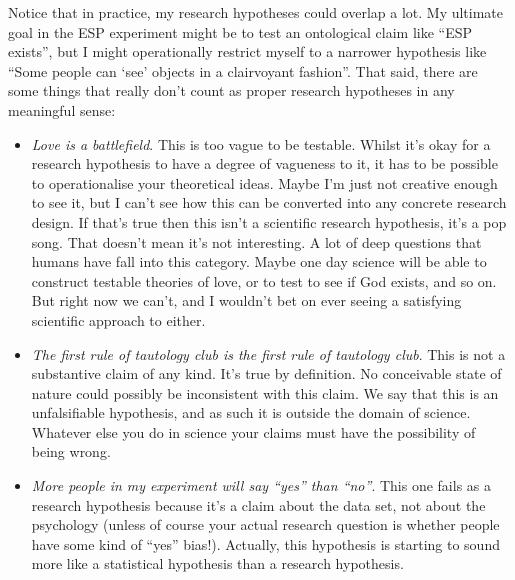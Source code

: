 \documentclass[
  a4paper,
]{book}
\providecommand{\tightlist}{%
  \setlength{\itemsep}{0pt}\setlength{\parskip}{0pt}}\usepackage{longtable,booktabs,array}
\begin{document}
Notice that in practice, my research hypotheses could overlap a lot. My
ultimate goal in the ESP experiment might be to test an ontological
claim like ``ESP exists'', but I might operationally restrict myself to
a narrower hypothesis like ``Some people can `see' objects in a
clairvoyant fashion''. That said, there are some things that really
don't count as proper research hypotheses in any meaningful sense:

\begin{itemize}
\tightlist
\item
  \emph{Love is a battlefield}. This is too vague to be testable. Whilst
  it's okay for a research hypothesis to have a degree of vagueness to
  it, it has to be possible to operationalise your theoretical ideas.
  Maybe I'm just not creative enough to see it, but I can't see how this
  can be converted into any concrete research design. If that's true
  then this isn't a scientific research hypothesis, it's a pop song.
  That doesn't mean it's not interesting. A lot of deep questions that
  humans have fall into this category. Maybe one day science will be
  able to construct testable theories of love, or to test to see if God
  exists, and so on. But right now we can't, and I wouldn't bet on ever
  seeing a satisfying scientific approach to either.
\item
  \emph{The first rule of tautology club is the first rule of tautology
  club}. This is not a substantive claim of any kind. It's true by
  definition. No conceivable state of nature could possibly be
  inconsistent with this claim. We say that this is an unfalsifiable
  hypothesis, and as such it is outside the domain of science. Whatever
  else you do in science your claims must have the possibility of being
  wrong.
\item
  \emph{More people in my experiment will say ``yes'' than ``no''}. This
  one fails as a research hypothesis because it's a claim about the data
  set, not about the psychology (unless of course your actual research
  question is whether people have some kind of ``yes'' bias!). Actually,
  this hypothesis is starting to sound more like a statistical
  hypothesis than a research hypothesis.
\end{itemize}
\end{document}
